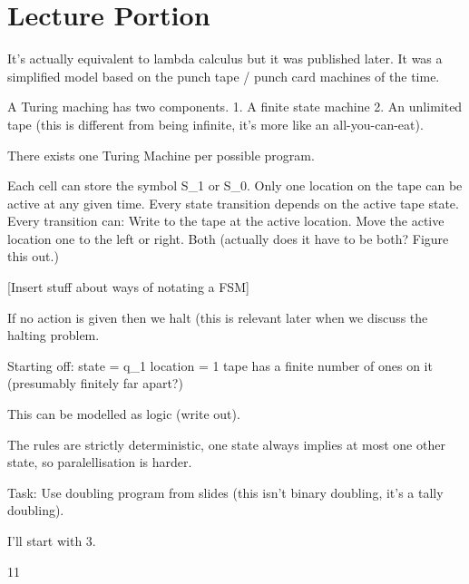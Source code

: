 \section{Lecture Portion}
It's actually equivalent to lambda calculus but it was published later.
It was a simplified model based on the punch tape / punch card machines of the time.

A Turing maching has two components.
1. A finite state machine
2. An unlimited tape (this is different from being infinite, it's more like an all-you-can-eat).

There exists one Turing Machine per possible program.

Each cell can store the symbol S_1 or S_0.
Only one location on the tape can be active at any given time.
Every state transition depends on the active tape state.
Every transition can:
  Write to the tape at the active location.
  Move the active location one to the left or right.
  Both (actually does it have to be both? Figure this out.)

[Insert stuff about ways of notating a FSM]

If no action is given then we halt (this is relevant later when we discuss the halting problem.

Starting off:
  state = q_1
  location = 1
  tape has a finite number of ones on it (presumably finitely far apart?)

This can be modelled as logic (write out).

The rules are strictly deterministic, one state always implies at most one other state, so paralellisation is harder.

Task:
Use doubling program from slides (this isn't binary doubling, it's a tally doubling).

I'll start with 3.

11


